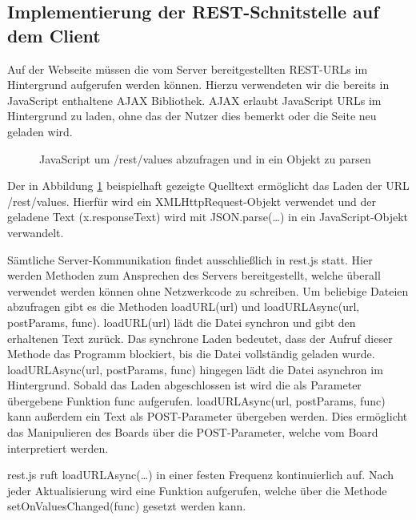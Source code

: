 

\subsection{Implementierung der REST-Schnitstelle auf dem Client}
Auf der Webseite müssen die vom Server bereitgestellten \ac{REST}-URLs im
Hintergrund aufgerufen werden können. Hierzu verwendeten wir die bereits in
JavaScript enthaltene \ac{AJAX} Bibliothek. \ac{AJAX} erlaubt JavaScript URLs im
Hintergrund zu laden, ohne das der Nutzer dies bemerkt oder die Seite neu geladen wird. 

\begin{figure}[H]

\caption{JavaScript um \textrm{/rest/values} abzufragen und in ein Objekt zu
parsen}
\label{AJAX-Request}
\end{figure}

Der in Abbildung \ref{AJAX-Request} beispielhaft gezeigte Quelltext ermöglicht
das Laden der \ac{URL} \textrm{/rest/values}.
Hierfür wird ein XMLHttpRequest-Objekt verwendet und der geladene Text
(\textrm{x.responseText}) wird mit \textrm{JSON.parse(\ldots)} in ein
JavaScript-Objekt verwandelt.

Sämtliche Server-Kommunikation findet ausschließlich in \textrm{rest.js} statt.
Hier werden Methoden zum Ansprechen des Servers bereitgestellt, welche überall
verwendet werden können ohne Netzwerkcode zu schreiben. Um beliebige Dateien
abzufragen gibt es die Methoden \textrm{loadURL(url)} und
\textrm{loadURLAsync(url, postParams, func)}. \textrm{loadURL(url)} lädt die
Datei synchron und gibt den erhaltenen Text zurück. Das synchrone Laden
bedeutet, dass der Aufruf dieser Methode das Programm blockiert, bis die Datei
vollständig geladen wurde. \textrm{loadURLAsync(url, postParams, func)} hingegen
lädt die Datei asynchron im Hintergrund. Sobald das Laden abgeschlossen ist wird
die als Parameter übergebene Funktion \textrm{func} aufgerufen.
\textrm{loadURLAsync(url, postParams, func)} kann außerdem ein Text als
POST-Parameter übergeben werden. Dies ermöglicht das Manipulieren des Boards
über die POST-Parameter, welche vom Board interpretiert werden.

\textrm{rest.js} ruft \textrm{loadURLAsync(\ldots)} in einer festen Frequenz
kontinuierlich auf. Nach jeder Aktualisierung wird eine Funktion aufgerufen,
welche über die Methode \textrm{setOnValuesChanged(func)} gesetzt werden kann.

